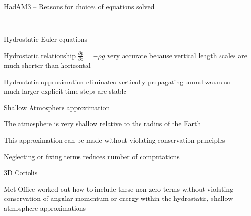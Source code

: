 \begin{slide}{HadAM3 -- Reasons for choices of equations solved}

\ \\
\begin{list1}
\item Hydrostatic Euler equations

\begin{list2}
    \item Hydrostatic relationship $\frac{\partial p}{\partial z} = -\rho g$ very accurate because vertical length scales are much shorter than horizontal
    \item Hydrostatic approximation eliminates vertically propagating sound waves so much larger explicit time steps are stable
\end{list2}

\item Shallow Atmosphere approximation
\begin{list2}
    \item The atmosphere is very shallow relative to the radius of the Earth
    \item This approximation can be made without violating conservation principles
    \item Neglecting or fixing terms reduces number of computations
\end{list2}

\item 3D Coriolis
\begin{list2}
    \item Met Office worked out how to include these non-zero terms without violating conservation of angular momentum or energy within the hydrostatic, shallow atmosphere approximations
\end{list2}

\end{list1}

\end{slide}

